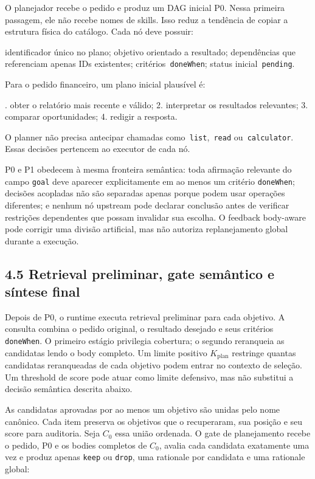 \documentclass[12pt,a4paper]{article}
\begin{document}
O planejador recebe o pedido e produz um DAG inicial P0. Nessa primeira passagem, ele não recebe nomes de skills. Isso reduz a tendência de copiar a estrutura física do catálogo. Cada nó deve possuir:


\noindent \textbullet{} identificador único no plano; \textbullet{} objetivo orientado a resultado; \textbullet{} dependências que referenciam apenas IDs existentes; \textbullet{} critérios\texttt{ doneWhen}; \textbullet{} status inicial\texttt{ pending}.\par

Para o pedido financeiro, um plano inicial plausível é:


. obter o relatório mais recente e válido; 2. interpretar os resultados relevantes; 3. comparar oportunidades; 4. redigir a resposta.\par

O planner não precisa antecipar chamadas como\texttt{ list},\texttt{ read} ou\texttt{ calculator}. Essas decisões pertencem ao executor de cada nó.

P0 e P1 obedecem à mesma fronteira semântica: toda afirmação relevante do campo \texttt{goal} deve aparecer explicitamente em ao menos um critério \texttt{doneWhen}; decisões acopladas não são separadas apenas porque podem usar operações diferentes; e nenhum nó upstream pode declarar conclusão antes de verificar restrições dependentes que possam invalidar sua escolha. O feedback body-aware pode corrigir uma divisão artificial, mas não autoriza replanejamento global durante a execução.



\subsection*{4.5 Retrieval preliminar, gate semântico e síntese final}

Depois de P0, o runtime executa retrieval preliminar para cada objetivo. A consulta combina o pedido original, o resultado desejado e seus critérios \texttt{doneWhen}. O primeiro estágio privilegia cobertura; o segundo reranqueia as candidatas lendo o body completo. Um limite positivo \(K_{\mathrm{plan}}\) restringe quantas candidatas reranqueadas de cada objetivo podem entrar no contexto de seleção. Um threshold de score pode atuar como limite defensivo, mas não substitui a decisão semântica descrita abaixo.

As candidatas aprovadas por ao menos um objetivo são unidas pelo nome canônico. Cada item preserva os objetivos que o recuperaram, sua posição e seu score para auditoria. Seja \(C_0\) essa união ordenada. O gate de planejamento recebe o pedido, P0 e os bodies completos de \(C_0\), avalia cada candidata exatamente uma vez e produz apenas \texttt{keep} ou \texttt{drop}, uma rationale por candidata e uma rationale global:
\end{document}
